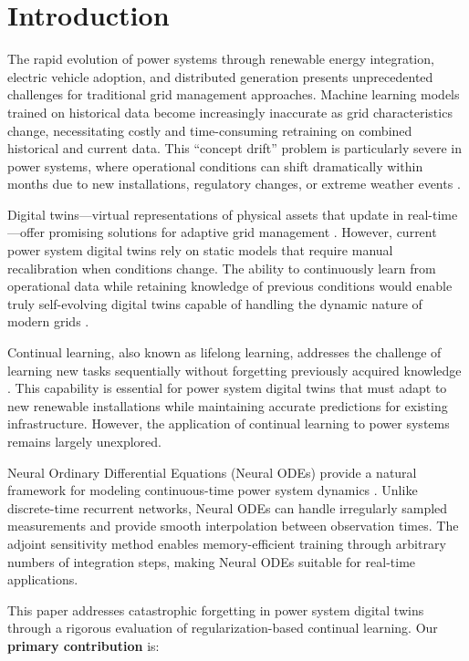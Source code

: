 \documentclass[journal,12pt,onecolumn]{IEEEtran}
\begin{document}
\section{Introduction}
\label{sec:introduction}

The rapid evolution of power systems through renewable energy integration, electric vehicle adoption, and distributed generation presents unprecedented challenges for traditional grid management approaches. Machine learning models trained on historical data become increasingly inaccurate as grid characteristics change, necessitating costly and time-consuming retraining on combined historical and current data. This ``concept drift'' problem is particularly severe in power systems, where operational conditions can shift dramatically within months due to new installations, regulatory changes, or extreme weather events \cite{ref1}.

Digital twins—virtual representations of physical assets that update in real-time—offer promising solutions for adaptive grid management \cite{ref2}. However, current power system digital twins rely on static models that require manual recalibration when conditions change. The ability to continuously learn from operational data while retaining knowledge of previous conditions would enable truly self-evolving digital twins capable of handling the dynamic nature of modern grids \cite{ref3}.

Continual learning, also known as lifelong learning, addresses the challenge of learning new tasks sequentially without forgetting previously acquired knowledge \cite{ref4}. This capability is essential for power system digital twins that must adapt to new renewable installations while maintaining accurate predictions for existing infrastructure. However, the application of continual learning to power systems remains largely unexplored.

Neural Ordinary Differential Equations (Neural ODEs) provide a natural framework for modeling continuous-time power system dynamics \cite{ref5}. Unlike discrete-time recurrent networks, Neural ODEs can handle irregularly sampled measurements and provide smooth interpolation between observation times. The adjoint sensitivity method enables memory-efficient training through arbitrary numbers of integration steps, making Neural ODEs suitable for real-time applications.

This paper addresses catastrophic forgetting in power system digital twins through a rigorous evaluation of regularization-based continual learning. Our \textbf{primary contribution} is:
\end{document}
